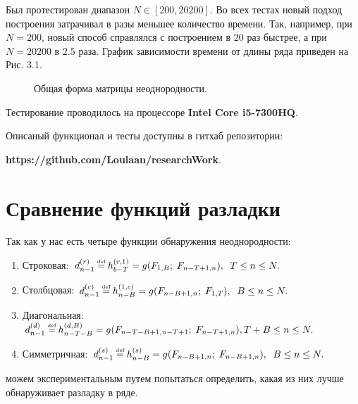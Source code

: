 \documentclass[specialist, substylefile = spbu.rtx,
			   subf, href, 12pt]{disser}
\newcommand\eqdef{\mathrel{\stackrel{\makebox[0pt]{\mbox{\normalfont\tiny def}}}{=}}}
\begin{document}
Был протестирован диапазон $ N \in [200, 20200] $. Во всех тестах новый подход построения затрачивал в разы меньшее количество времени. Так, например, при $ N = 200 $, новый способ справлялся с построением в $ 20 $ раз быстрее, а при $ N = 20200 $ в $ 2.5 $ раза. График зависимости времени от длины ряда приведен на Рис. 3.1.

\begin{figure}[h]
	\caption{Общая форма матрицы неоднородности.}
\end{figure}

Тестирование проводилось на процессоре \textbf{Intel Core i5-7300HQ}.

Описаный функционал и тесты доступны в гитхаб репозитории:

\textbf{https://github.com/Loulaan/researchWork}.


\newpage
\chapter{Сравнение функций разладки}

Так как у нас есть четыре функции обнаружения неоднородности:
\begin{enumerate}
	\item 
	Строковая: $d_{n-1}^{(r)} \eqdef h_{b-T}^{(r, 1)} = g(F_{1, B};\; F_{n-T+1, n}), \;\; T \leq n \leq N.$
	
	\item
	Столбцовая: $d_{n-1}^{(c)} \eqdef h_{n-B}^{(1, c)} = g(F_{n-B+1, n};\; F_{1, T}), \;\; B \leq n \leq N.$
	
	\item
	Диагональная: $d_{n-1}^{(d)} \eqdef h_{n-T-B}^{(d, B)} = g(F_{n-T-B+1, n-T+1};\; F_{n-T+1, n}), T + B \leq n \leq N.$
	
	\item
	Симметричная: $d_{n-1}^{(s)} \eqdef h_{n-B}^{(s)} = g(F_{n-B+1, n};\; F_{n-B+1, n}), \;\; B \leq n \leq N.$
	
\end{enumerate}
можем экспериментальным путем попытаться определить, какая из них лучше обнаруживает разладку в ряде.
\end{document}
